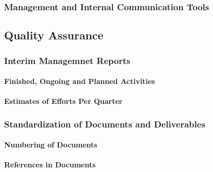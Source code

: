 \documentclass[
  11pt,
]{article}
\begin{document}
\hypertarget{management-and-internal-communication-tools}{%
\subsubsection{Management and Internal Communication
Tools}\label{management-and-internal-communication-tools}}

\hypertarget{quality-assurance-1}{%
\subsection{Quality Assurance}\label{quality-assurance-1}}

\hypertarget{interim-managemnet-reports}{%
\subsubsection{Interim Managemnet
Reports}\label{interim-managemnet-reports}}

\hypertarget{finished-ongoing-and-planned-activities}{%
\paragraph{Finished, Ongoing and Planned
Activities}\label{finished-ongoing-and-planned-activities}}

\hypertarget{estimates-of-efforts-per-quarter}{%
\paragraph{Estimates of Efforts Per
Quarter}\label{estimates-of-efforts-per-quarter}}

\hypertarget{standardization-of-documents-and-deliverables}{%
\subsubsection{Standardization of Documents and
Deliverables}\label{standardization-of-documents-and-deliverables}}

\hypertarget{numbering-of-documents}{%
\paragraph{Numbering of Documents}\label{numbering-of-documents}}

\hypertarget{references-in-documents}{%
\paragraph{References in Documents}\label{references-in-documents}}
\end{document}
